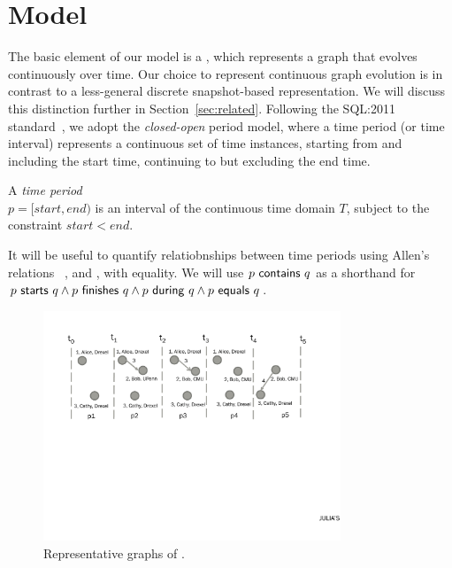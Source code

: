\section{Model}
\label{sec:model}

The basic element of our model is a \tg, which represents a graph that
evolves continuously over time.  Our choice to represent continuous
graph evolution is in contrast to a less-general discrete
snapshot-based representation.  We will discuss this distinction
further in Section~\ref{sec:related}.  Following the SQL:2011
standard~\cite{DBLP:journals/sigmod/KulkarniM12}, we adopt the {\em
  closed-open} period model, where a time period (or time interval)
represents a continuous set of time instances, starting from and
including the start time, continuing to but excluding the end time.

\begin{definition}
A {\em time period} \\$p = [start, end)$ is an interval of the
  continuous time domain $T$, subject to the constraint $start < end$.
\label{def:period} 
\end{definition}

It will be useful to quantify relatiobnships between time periods
using Allen's relations~\cite{allen83} ,
 and , with equality.  We will
use $p~\mathsf{contains}~q$ as a shorthand for $p~\mathsf{starts}~q
\wedge p~\mathsf{finishes}~q \wedge p~\mathsf{during}~q \wedge
p~\mathsf{equals}~q$.

\begin{figure}
\centering
\includegraphics[width=3.5in]{figs/T1_graphs.pdf}
\caption{Representative graphs of \tg {}.}
\label{fig:tg_rg}
\end{figure}

